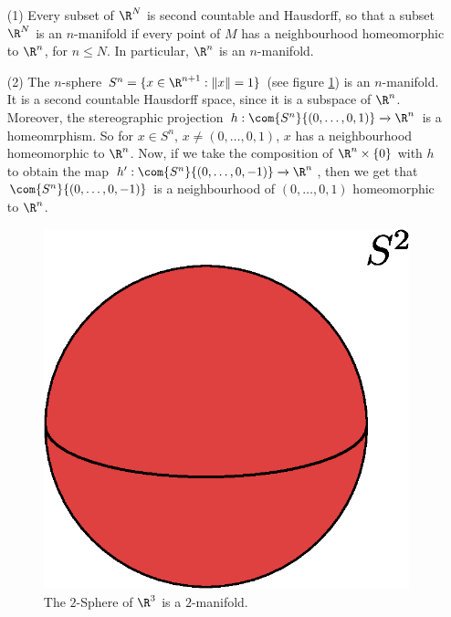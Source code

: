 \begin{example}\label{example_1.1}
    \begin{enumerate}
        \item[(1)] Every subset of $\R^N$ is second countable and Hausdorff, so
            that a subset  $\R^N$ is an  $n$-manifold if every point of  $M$ has
            a neighbourhood homeomorphic to  $\R^n$, for $n \leq N$. In
            particular, $\R^n$ is an $n$-manifold.

            \item[(2)] The $n$-sphere  $S^n=\{x \in \R^{n+1} : \|x\|=1\}$ (see
                figure \ref{fig_1.1}) is an $n$-manifold. It is a second countable
                Hausdorff space, since it is a subspace of  $\R^n$. Moreover, the
                stereographic projection $h:\com{S^n}{(0, \dots, 0,1)}
                \xrightarrow{} \R^n$ is a homeomrphism. So for $x \in S^n$,
                $x \neq (0, \dots, 0,1)$, $x$ has a neighbourhood homeomorphic to
                $\R^n$. Now, if we take the composition of  $\R^n \times \{0\}$
                with $h$ to obtain the map  $h':\com{S^n}{(0,\dots,0,-1)}
                \xrightarrow{} \R^n$, then we get that $\com{S^n}{(0, \dots, 0,-1)}$
                is a neighbourhood of $(0, \dots, 0,1)$ homeomorphic to $\R^n$.
                  \begin{figure}[h]
                     \centering
                     \includegraphics[scale=0.5]{Figures/chapter1/2_sphere.eps}
                     \caption{The $2$-Sphere of $\R^3$ is a $2$-manifold.}
                     \label{fig_1.1}
                 \end{figure}


\end{enumerate}
\end{example}
